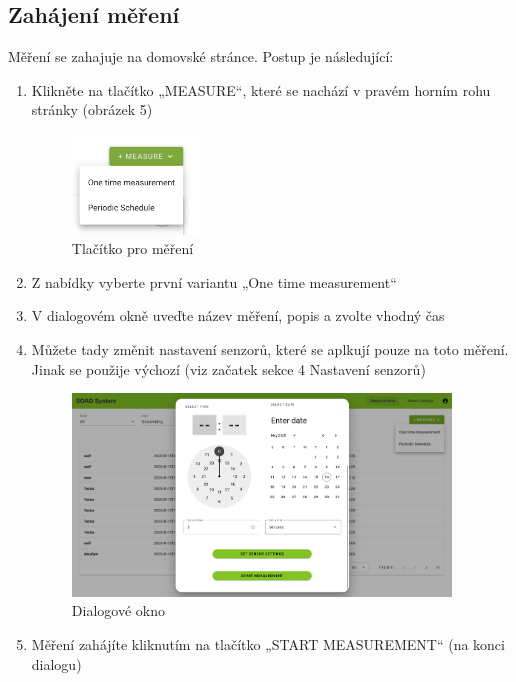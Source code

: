 \documentclass[12pt]{article}
\begin{document}
\begin{teamwork}
        \subsection{Zahájení měření}\label{subsec:zahajeni-mereni}

        Měření se zahajuje na domovské stránce.
        Postup je následující:

        \begin{enumerate}
            \item Klikněte na tlačítko „MEASURE“, které se nachází v pravém horním rohu stránky (obrázek 5)
            \begin{figure}[hbt!]
                \centering
                \includegraphics[width=0.32\textwidth]{../../img/measure_one_time_button}
                \caption{Tlačítko pro měření}
                \label{fig:measure_one_time}
            \end{figure}
            \item Z nabídky vyberte první variantu „One time measurement“
            \item V dialogovém okně uveďte název měření, popis a zvolte vhodný čas
            \item Můžete tady změnit nastavení senzorů, které se aplkují pouze na toto měření.
            Jinak se použije výchozí (viz začatek sekce 4 Nastavení senzorů)
            \begin{figure}[hbt!]
                  \centering
                  \includegraphics[width=0.95\textwidth]{../../img/one_time_measure_dialog}
                  \caption{Dialogové okno}
                  \label{fig:one_time_measure_dialog}
            \end{figure}
            \item Měření zahájíte kliknutím na tlačítko „START MEASUREMENT“ (na konci dialogu)
        \end{enumerate}


\end{teamwork}
\end{document}
